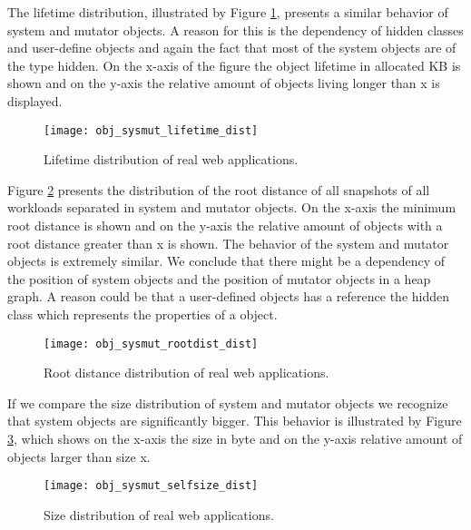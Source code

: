 The lifetime distribution, illustrated by Figure \ref{fig:obj_sysmut_lieftiem_dist}, presents a similar behavior of system and mutator objects. A reason for this is the dependency of hidden classes and user-define objects and again the fact that most of the system objects are of the type hidden. On the x-axis of the figure the object lifetime in allocated KB is shown and on the y-axis the relative amount of objects living longer than x is displayed. 
\begin{figure}
	\centering
	\texttt{[image: obj\_sysmut\_lifetime\_dist]}
	\caption{Lifetime distribution of real web applications.}
	\label{fig:obj_sysmut_lieftiem_dist}
\end{figure}

Figure \ref{fig:obj_sysmut_rootdist_dist} presents the distribution of the root distance of all snapshots of all workloads separated in system and mutator objects. On the x-axis the minimum root distance is shown and on the y-axis the relative amount of objects with a root distance greater than x is shown. The behavior of the system and mutator objects is extremely similar. We conclude that there might be a dependency of the position of system objects and the position of mutator objects in a heap graph. A reason could be that a user-defined objects has a reference the hidden class which represents the properties of a object.  
\begin{figure}
	\centering
	\texttt{[image: obj\_sysmut\_rootdist\_dist]}
	\caption{Root distance distribution of real web applications.}
	\label{fig:obj_sysmut_rootdist_dist}
\end{figure}

If we compare the size distribution of system and mutator objects we recognize that system objects are significantly bigger. This behavior is illustrated by Figure \ref{fig:obj_sysmut_selfsize_dist}, which shows on the x-axis the size in byte and on the y-axis relative amount of objects larger than size x.
\begin{figure}
	\centering
	\texttt{[image: obj\_sysmut\_selfsize\_dist]}
	\caption{Size distribution of real web applications.}
	\label{fig:obj_sysmut_selfsize_dist}
\end{figure}